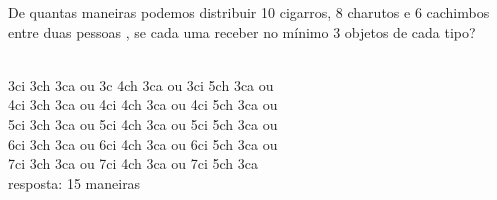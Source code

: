 \begin{ex}
 De quantas maneiras podemos distribuir 10 cigarros, 8 charutos e 6 cachimbos entre duas pessoas , se cada uma receber no mínimo 3 objetos de cada tipo?
   \begin{sol}
       \phantom{A} \\
     3ci 3ch 3ca ou 3c 4ch 3ca ou 3ci 5ch 3ca ou\\
     4ci 3ch 3ca ou 4ci 4ch 3ca ou 4ci 5ch 3ca ou\\
     5ci 3ch 3ca ou 5ci 4ch 3ca ou 5ci 5ch 3ca ou\\
     6ci 3ch 3ca ou 6ci 4ch 3ca ou 6ci 5ch 3ca ou\\
     7ci 3ch 3ca ou 7ci 4ch 3ca ou 7ci 5ch 3ca\\
     resposta: 15 maneiras
   \end{sol}
\end{ex}